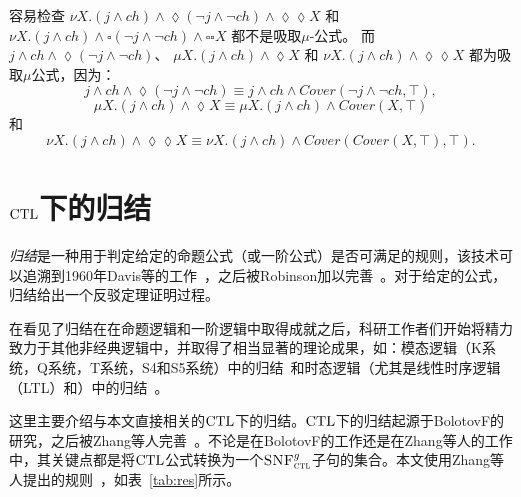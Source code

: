 \begin{example}\label{exmp:disF}
	容易检查 $\nu X. (j \wedge ch) \wedge \lozenge (\neg j \wedge \neg ch) \wedge \lozenge \lozenge X$ 和  $\nu X. (j \wedge ch) \wedge \square (\neg j \wedge \neg ch) \wedge \square \square X$ 都不是吸取$\mu$-公式。
	而 $j \wedge ch \wedge \lozenge (\neg j \wedge \neg ch)$、 $\mu X. (j \wedge ch) \wedge \lozenge X$ 和 $\nu X. (j \wedge ch) \wedge \lozenge \lozenge X$ 都为吸取$\mu$公式，因为：
	\[
	j \wedge ch \wedge \lozenge (\neg j \wedge \neg ch) \equiv j \wedge ch \wedge Cover(\neg j \wedge \neg ch, \top),
	\]
	\[
	\mu X. (j \wedge ch) \wedge \lozenge X \equiv  \mu X. (j \wedge ch) \wedge Cover(X, \top)
	\] 和
	\[
	\nu X. (j \wedge ch) \wedge \lozenge \lozenge X \equiv \nu X. (j \wedge ch) \wedge Cover(Cover(X, \top), \top).
	\]
	
\end{example}

\section{$\textrm{CTL}$下的归结}\label{chapter02:CTLres}

\emph{归结}是一种用于判定给定的命题公式（或一阶公式）是否可满足的规则，该技术可以追溯到1960年Davis等的工作~\cite{DBLP:journals/jacm/DavisP60}，之后被Robinson加以完善~\cite{DBLP:journals/jacm/Robinson65}。对于给定的公式，归结给出一个反驳定理证明过程。

在看见了归结在在命题逻辑和一阶逻辑中取得成就之后，科研工作者们开始将精力致力于其他非经典逻辑中，并取得了相当显著的理论成果，如：模态逻辑（K系统，Q系统，T系统，S4和S5系统）中的归结~\cite{DBLP:journals/tcs/EnjalbertC89}和时态逻辑（尤其是线性时序逻辑（LTL）和\CTL）中的归结~\cite{DBLP:conf/cade/CavalliC84,DBLP:journals/jetai/BolotovF99}。

这里主要介绍与本文直接相关的$\textrm{CTL}$下的归结。$\textrm{CTL}$下的归结起源于BolotovF的研究\cite{DBLP:journals/jetai/BolotovF99}，之后被Zhang等人完善~\cite{zhang2014resolution}。不论是在BolotovF的工作还是在Zhang等人的工作中，其关键点都是将$\textrm{CTL}$公式转换为一个${\textsc{SNF}_{\textsc{ctl}}^g}$子句的集合。本文使用Zhang等人提出的规则~\cite{zhang2014resolution}，如表~\ref{tab:res}所示。

